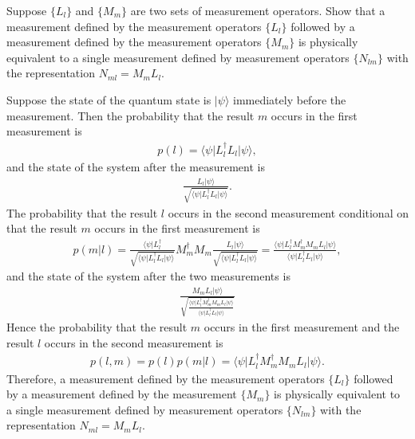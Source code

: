 \documentclass[en]{sol-man}
\begin{document}
\begin{exe}
    Suppose $\{L_l\}$ and $\{M_m\}$ are two sets of measurement operators. Show that a measurement defined by the measurement operators $\{L_l\}$ followed by a measurement defined by the measurement operators $\{M_m\}$ is physically equivalent to a single measurement defined by measurement operators $\{N_{lm}\}$ with the representation $N_{ml}=M_mL_l$.
\end{exe}
\begin{pf}
    Suppose the state of the quantum state is $\lvert\psi\rangle$ immediately before the measurement. Then the probability that the result $m$ occurs in the first measurement is
    \begin{align}
        p(l)=\langle\psi\rvert L_l^{\dagger}L_l\lvert\psi\rangle,
    \end{align}
    and the state of the system after the measurement is
    \begin{align}
        \frac{L_l\lvert\psi\rangle}{\sqrt{\langle\psi\rvert L_l^{\dagger}L_l\lvert\psi\rangle}}.
    \end{align}
    The probability that the result $l$ occurs in the second measurement conditional on that the result $m$ occurs in the first measurement is
    \begin{align}
        p(m\vert l)=\frac{\langle\psi\rvert L_l^{\dagger}}{\sqrt{\langle\psi\rvert L_l^{\dagger}L_l\lvert\psi\rangle}}M_m^{\dagger}M_m\frac{L_l\lvert\psi\rangle}{\sqrt{\langle\psi\rvert L_l^{\dagger}L_l\lvert\psi\rangle}}=\frac{\langle\psi\rvert L_l^{\dagger}M_m^{\dagger}M_mL_l\lvert\psi\rangle}{\langle\psi\rvert L_l^{\dagger}L_l\lvert\psi\rangle},
    \end{align}
    and the state of the system after the two measurements is
    \begin{align}
        \frac{M_mL_l\lvert\psi\rangle}{\sqrt{\frac{\langle\psi\rvert L_l^{\dagger}M_m^{\dagger}M_mL_l\lvert\psi\rangle}{\langle\psi\rvert L_l^{\dagger}L_l\lvert\psi\rangle}}}
    \end{align}
    Hence the probability that the result $m$ occurs in the first measurement and the result $l$ occurs in the second measurement is
    \begin{align}
        p(l,m)=p(l)p(m\vert l)=\langle\psi\rvert L_l^{\dagger}M_m^{\dagger}M_mL_l\lvert\psi\rangle.
    \end{align}
    Therefore, a measurement defined by the measurement operators $\{L_l\}$ followed by a measurement defined by the measurement $\{M_m\}$ is physically equivalent to a single measurement defined by measurement operators $\{N_{lm}\}$ with the representation $N_{ml}=M_mL_l$.
\end{pf}
\end{document}
